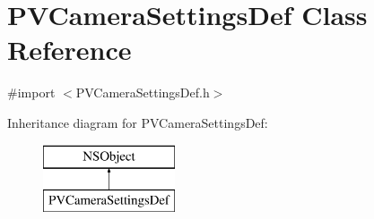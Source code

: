 \hypertarget{interface_p_v_camera_settings_def}{}\section{P\+V\+Camera\+Settings\+Def Class Reference}
\label{interface_p_v_camera_settings_def}


{\ttfamily \#import $<$P\+V\+Camera\+Settings\+Def.\+h$>$}

Inheritance diagram for P\+V\+Camera\+Settings\+Def\+:\begin{figure}[H]
\begin{center}
\leavevmode
\includegraphics[height=2.000000cm]{interface_p_v_camera_settings_def}
\end{center}
\end{figure}

